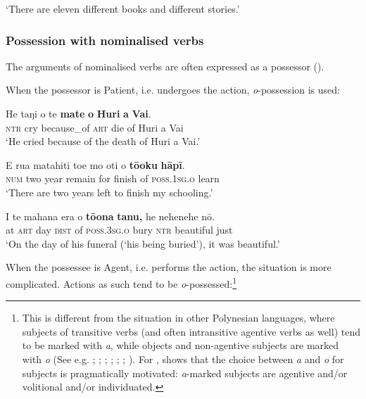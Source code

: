 \glt 
‘There are eleven different books and different stories.’ \textstyleExampleref{[R206.019]} 
\z

\subsubsection[Possession with nominalised verbs]{Possession with nominalised verbs}\label{sec:6.3.3.4}

The arguments of nominalised verbs are often expressed as a possessor (). 

When the possessor is Patient, i.e. undergoes the action, \textit{o}{}-possession is used:

\ea\label{ex:6.101}
\gll He taŋi {\ꞌ}o te \textbf{mate} \textbf{o} \textbf{Huri} \textbf{{\ꞌ}a} \textbf{Vai}. \\
\textsc{ntr} cry because\_of \textsc{art} die of Huri a Vai \\

\glt 
‘He cried because of the death of Huri a Vai.’ \textstyleExampleref{[R304.104]} 
\z

\ea\label{ex:6.102}
\gll E rua matahiti toe mo oti o \textbf{tō{\ꞌ}oku} \textbf{hāpī}. \\
\textsc{num} two year remain for finish of \textsc{poss.1sg.o} learn \\

\glt 
‘There are two years left to finish my schooling.’ \textstyleExampleref{[R399.070]} 
\z

\ea\label{ex:6.103}
\gll {\ꞌ}I te mahana era o \textbf{tō{\ꞌ}ona} \textbf{tanu,} he nehenehe nō.\\
at \textsc{art} day \textsc{dist} of \textsc{poss.3sg.o} bury \textsc{ntr} beautiful just\\

\glt 
‘On the day of his funeral (‘his being buried’), it was beautiful.’ \textstyleExampleref{[R309.140]} 
\z

When the possessee is Agent, i.e. performs the action, the situation is more complicated. Actions as such tend to be \textit{o}{}-possessed:\footnote{\label{fn:301}This is different from the situation in other Polynesian languages, where subjects of transitive verbs (and often intransitive agentive verbs as well) tend to be marked with \textit{a}, while objects and non-agentive subjects are marked with \textit{o} (See e.g. \citealt{Chung1973}; \citealt[69]{Clark1981}; \citealt[197–201]{LazardPeltzer2000}; \citealt[173–174]{Cablitz2006}; \citealt[540–541]{MoselHovdhaugen1992}; \citealt[503–505]{Besnier2000}; \citealt[140–142]{ElbertPukui1979}). For , \citet{Baker2012} shows that the choice between \textit{a} and \textit{o} for subjects is pragmatically motivated: \textit{a}{}-marked subjects are agentive and/or volitional and/or individuated.}

